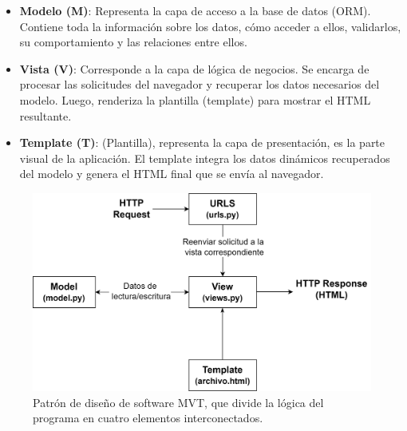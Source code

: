 \begin{itemize}
    \item \textbf{Modelo (M)}: Representa la capa de acceso a la base de datos (ORM). Contiene toda la información sobre los datos, cómo acceder a ellos, validarlos, su comportamiento y las relaciones entre ellos.
    \item \textbf{Vista (V)}:  Corresponde a la capa de lógica de negocios. Se encarga de procesar las solicitudes del navegador y recuperar los datos necesarios del modelo. Luego, renderiza la plantilla (template) para mostrar el HTML resultante.
    \item \textbf{Template (T)}: (Plantilla), representa la capa de presentación, es la parte visual de la aplicación. El template integra los datos dinámicos recuperados del modelo y genera el HTML final que se envía al navegador.

\end{itemize}
\begin{figure}[H]
    \centering
    \includegraphics[width=0.8\linewidth]{Figuras/AplicacionWeb/patronMVT.png}
    \caption{Patrón de diseño de software MVT, que divide la lógica del programa en cuatro elementos interconectados.}
    \label{fig:patronMVT}
\end{figure}

